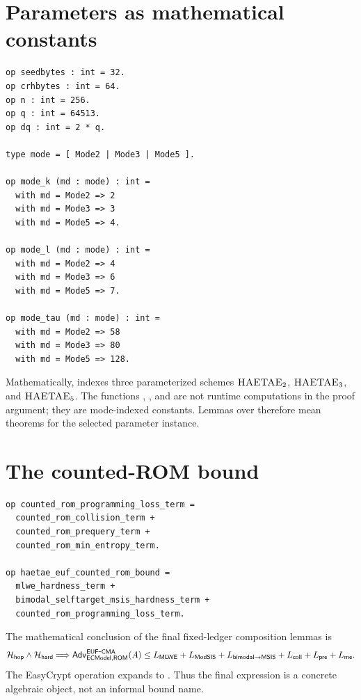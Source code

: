 \section{Parameters as mathematical constants}
\label{app:case-params}

\begin{lstlisting}[language=EasyCrypt,caption={Representative parameter declarations in \ec{HAETAE\_Params.ec}.},label={lst:haetae-params-snippet}]
op seedbytes : int = 32.
op crhbytes : int = 64.
op n : int = 256.
op q : int = 64513.
op dq : int = 2 * q.

type mode = [ Mode2 | Mode3 | Mode5 ].

op mode_k (md : mode) : int =
  with md = Mode2 => 2
  with md = Mode3 => 3
  with md = Mode5 => 4.

op mode_l (md : mode) : int =
  with md = Mode2 => 4
  with md = Mode3 => 6
  with md = Mode5 => 7.

op mode_tau (md : mode) : int =
  with md = Mode2 => 58
  with md = Mode3 => 80
  with md = Mode5 => 128.
\end{lstlisting}

Mathematically,  indexes three parameterized schemes
\(\textsc{HAETAE}_2\), \(\textsc{HAETAE}_3\), and \(\textsc{HAETAE}_5\).  The functions ,
, and  are not runtime computations in the proof
argument; they are mode-indexed constants.  Lemmas over 
therefore mean theorems for the selected parameter instance.

\section{The counted-ROM bound}
\label{app:case-counted-rom-bound}

\begin{lstlisting}[language=EasyCrypt,caption={Final counted-ROM bound expression.},label={lst:case-counted-rom-bound}]
op counted_rom_programming_loss_term =
  counted_rom_collision_term +
  counted_rom_prequery_term +
  counted_rom_min_entropy_term.

op haetae_euf_counted_rom_bound =
  mlwe_hardness_term +
  bimodal_selftarget_msis_hardness_term +
  counted_rom_programming_loss_term.
\end{lstlisting}

The mathematical conclusion of the final fixed-ledger composition lemmas is
\[
  \mathcal{H}_{\mathsf{hop}}
  \wedge
  \mathcal{H}_{\mathsf{hard}}
  \Longrightarrow
  \mathsf{Adv}_{\mathsf{ECModel},\mathsf{ROM}}^{\mathsf{EUF}\mbox{-}\mathsf{CMA}}(A)
  \le
  L_{\mathsf{MLWE}}
  +L_{\mathsf{ModSIS}}
  +L_{\mathsf{bimodal}\to\mathsf{MSIS}}
  +L_{\mathsf{coll}}
  +L_{\mathsf{pre}}
  +L_{\mathsf{me}}.
\]
The EasyCrypt operation  expands
to .
Thus the final expression is a concrete algebraic object, not an informal bound
name.


